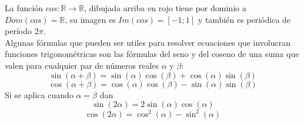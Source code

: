 \documentclass[Análisis.root.tex]{subfiles}
\newcommand{\R}{\mathbb{R}}
\begin{document}
        La función \(cos:\R\rightarrow\R\), dibujada arriba en rojo tiene por dominio a \(Dom(cos) = \R\), su imagen es \(Im(cos) = [−1; 1]\) y también es periódica de período \(2\pi\).\\
        Algunas fórmulas que pueden ser utiles para resolver ecuaciones que involucran funciones trigonométricas son las fórmulas del seno y del coseno de una suma que valen para cualquier par de números reales \(\alpha\) y \(\beta\):
        \[\sin(\alpha+\beta)=\sin(\alpha)\cos(\beta)+\cos(\alpha)\sin(\beta)\]
        \[\cos(\alpha+\beta)=\cos(\alpha)\cos(\beta)-\sin(\alpha)\sin(\beta)\]
        Si se aplica cuando \(\alpha=\beta\) dan
        \[\sin(2\alpha)=2\sin(\alpha)\cos(\alpha)\]
        \[\cos(2\alpha)=\cos^2(\alpha)-\sin^2(\alpha)\]
\end{document}
